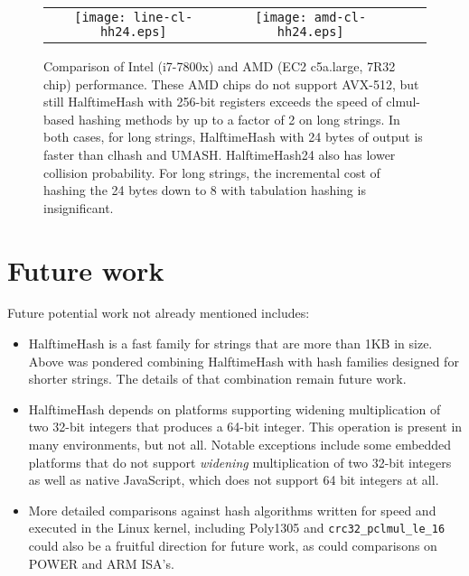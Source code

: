 \documentclass[runningheads]{llncs}
\begin{document}
\begin{figure*}
\begin{tabular}{cccc}
\texttt{[image: line-cl-hh24.eps]}
&
\texttt{[image: amd-cl-hh24.eps]}
\end{tabular}
\caption{
  \label{vs-cl}
  Comparison of Intel (i7-7800x) and AMD (EC2 c5a.large, 7R32 chip) performance.
  These AMD chips do not support AVX-512, but still HalftimeHash with 256-bit registers exceeds the speed of clmul-based hashing methods by up to a factor of 2 on long strings.
  In both cases, for long strings, HalftimeHash with 24 bytes of output is faster than clhash and UMASH.
  HalftimeHash24 also has lower collision probability.
  For long strings, the incremental cost of hashing the 24 bytes down to 8 with tabulation hashing is insignificant.
}
\end{figure*}





\section{Future work}

Future potential work not already mentioned includes:

\begin{itemize}
\item HalftimeHash is a fast family for strings that are more than 1KB in size.
  Above was pondered combining HalftimeHash with hash families designed for shorter strings.
  The details of that combination remain future work.
\item HalftimeHash depends on platforms supporting widening multiplication of two 32-bit integers that produces a 64-bit integer.
  This operation is present in many environments, but not all.
  Notable exceptions include some embedded platforms that do not support {\em widening} multiplication of two 32-bit integers as well as native JavaScript, which does not support 64 bit integers at all.
\item More detailed comparisons against hash algorithms written for speed and executed in the Linux kernel, including Poly1305 and \texttt{crc32\_pclmul\_le\_16} could also be a fruitful direction for future work, as could comparisons on POWER and ARM ISA's.
\end{itemize}
\end{document}
